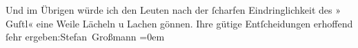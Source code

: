 \begin{ledgroupsized}[t]{13cm}
           \pstart
           Und im Übrigen würde ich den Leuten nach der ſcharfen Eindringlichkeit des »\label{T_L01717-2v}\label{T_L01717-2h} Guſtl«
               eine  Weile Lächeln u Lachen gönnen.\pend
           \pstart
           Ihre gütige Entſcheidungen erhoffend{\\[\baselineskip]}ſehr ergeben:\spacefill\mbox{Stefan
                  Großmann}\pend
           \leftskip=0em{}
         
         \endnumbering{}\end{ledgroupsized}  \newcommand{\dateiname}{L01717}\newcommand{\titel}{Stefan Großmann an Arthur Schnitzler, 7. 10. 1907}\newcommand{\editorInnen}{ Martin Anton Müller und Gerd-Hermann Susen}
      